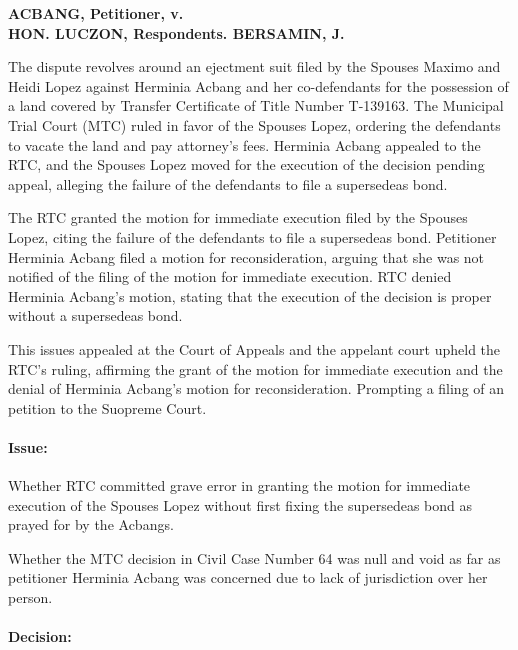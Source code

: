 \documentclass[
12pt,
oneside,
onehalfspacing,
headsepline
]{DigestCollection}
\begin{document}
\label{de4d9020-0a19-11ef-932c-63c852f65e48}


\noindent\textbf{ACBANG, Petitioner, v. \\HON. LUCZON, Respondents. BERSAMIN, J.}\vspace{0.4cm}

The dispute revolves around an ejectment suit filed by the Spouses Maximo and Heidi Lopez against Herminia Acbang and her co-defendants for the possession of a land covered by Transfer Certificate of Title Number T-139163. The Municipal Trial Court (MTC) ruled in favor of the Spouses Lopez, ordering the defendants to vacate the land and pay attorney’s fees. Herminia Acbang appealed to the RTC, and the Spouses Lopez moved for the execution of the decision pending appeal, alleging the failure of the defendants to file a supersedeas bond.

The RTC granted the motion for immediate execution filed by the Spouses Lopez, citing the failure of the defendants to file a supersedeas bond. Petitioner Herminia Acbang filed a motion for reconsideration, arguing that she was not notified of the filing of the motion for immediate execution. RTC denied Herminia Acbang's motion, stating that the execution of the decision is proper without a supersedeas bond.

This issues appealed at the Court of Appeals and the appelant court upheld the RTC's ruling, affirming the grant of the motion for immediate execution and the denial of Herminia Acbang's motion for reconsideration. Prompting a filing of an petition to the Suopreme Court. 

\paragraph{Issue:}
\label{b8ad10b0-1253-11ef-aa24-9916ea601717}


Whether RTC committed grave error in granting the motion for immediate execution of the Spouses Lopez without first fixing the supersedeas bond as prayed for by the Acbangs.

Whether the MTC decision in Civil Case Number 64 was null and void as far as petitioner Herminia Acbang was concerned due to lack of jurisdiction over her person.

\paragraph{Decision:}
\label{cbc16750-1253-11ef-aa24-9916ea601717}
\end{document}
